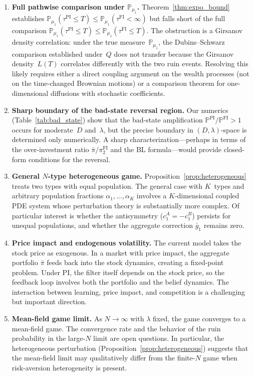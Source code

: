 \documentclass[12pt]{article}
\theoremstyle{remark}
\theoremstyle{definition}
\newcommand{\Prob}{\mathbb{P}}
\newcommand{\FI}{\mathrm{FI}}
\newcommand{\PI}{\mathrm{PI}}
\begin{document}
\begin{enumerate}[label=\arabic*.]
\item \textbf{Full pathwise comparison under $\Prob_{\mu_1}$.}
Theorem~\ref{thm:expo_bound} establishes
$\Prob_{\mu_1}(\tau^{\PI} \le T) \le \Prob_{\mu_1}(\tau^{\FI} < \infty)$
but falls short of the full comparison
$\Prob_{\mu_1}(\tau^{\PI} \le T) \le \Prob_{\mu_1}(\tau^{\FI} \le T)$.
The obstruction is a Girsanov density correlation: under the true
measure~$\Prob_{\mu_1}$, the Dubins--Schwarz comparison established
under~$Q$ does not transfer because the Girsanov density~$L(T)$
correlates differently with the two ruin events.
Resolving this likely requires either a direct coupling argument
on the wealth processes (not on the time-changed Brownian motions)
or a comparison theorem for one-dimensional diffusions with
stochastic coefficients.

\item \textbf{Sharp boundary of the bad-state reversal region.}
Our numerics (Table~\ref{tab:bad_state}) show that the
bad-state amplification $\Prob^{\PI}/\Prob^{\FI} > 1$ occurs
for moderate~$D$ and~$\lambda$, but the precise boundary in
$(D, \lambda)$-space is determined only numerically.
A sharp characterization---perhaps in terms of the over-investment
ratio $\bar{\pi}/\pi_2^{\FI}$ and the BL formula---would provide
closed-form conditions for the reversal.

\item \textbf{General $N$-type heterogeneous game.}
Proposition~\ref{prop:heterogeneous} treats two types with equal population.
The general case with $K$~types and arbitrary population fractions
$\alpha_1, \ldots, \alpha_K$ involves a $K$-dimensional coupled PDE
system whose perturbation theory is substantially more complex.
Of particular interest is whether the antisymmetry
($c_1^A = -c_1^B$) persists for unequal populations, and whether
the aggregate correction $\bar{g}_1$ remains zero.

\item \textbf{Price impact and endogenous volatility.}
The current model takes the stock price as exogenous.
In a market with price impact, the aggregate portfolio
$\bar{\pi}$ feeds back into the stock dynamics, creating a
fixed-point problem.
Under PI, the filter itself depends on the stock price, so the
feedback loop involves both the portfolio and the belief dynamics.
The interaction between learning, price impact, and competition
is a challenging but important direction.

\item \textbf{Mean-field game limit.}
As $N \to \infty$ with $\lambda$ fixed, the game converges to a
mean-field game.
The convergence rate and the behavior of the ruin probability in
the large-$N$ limit are open questions.
In particular, the heterogeneous perturbation
(Proposition~\ref{prop:heterogeneous}) suggests that the mean-field limit
may qualitatively differ from the finite-$N$ game when
risk-aversion heterogeneity is present.
\end{enumerate}
\end{document}
